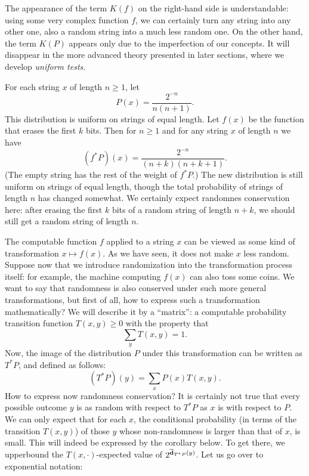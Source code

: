 The appearance of the term $K(f)$ on the right-hand side is understandable:
using some very complex function $f$, we can certainly turn any string
into any other one, also a random string into a much less random one.
On the other hand, the term $K(P)$ appears only due to the
imperfection of our concepts.
It will disappear in the more advanced theory presented in later sections,
where we develop \emph{uniform tests}.

\begin{example}
For each string $x$ of length $n \ge 1$, let
 \[
  P(x) = \frac{2^{-n}}{n(n+1)}.
 \]
This distribution is uniform on strings of equal length.
Let $f(x)$ be the function that erases the first $k$ bits.
Then for $n \ge 1$ and for any string $x$ of length $n$
we have
 \[
  (f^{*}P)(x) = \frac{2^{-n}}{(n+k)(n+k+1)}.
 \]
(The empty string has the rest of the weight of $f^{*}P$.)
The  new distribution is still uniform on strings of equal length,
though
the total probability of strings of length $n$ has changed somewhat.
We certainly expect randomnes conservation here:
after erasing the first $k$ bits of
a random string of length $n+k$, we should
still get a random string of length $n$.
\end{example}

The computable
function $f$ applied to a string $x$ can be viewed as some kind of
transformation $x \mapsto f(x)$.
As we have seen, it does not make $x$ less random.
Suppose now that we introduce randomization into the transformation
process itself: for example, the machine computing $f(x)$ can also toss
some coins.
We want to say that randomness is also conserved under such more general
transformations, but first of all, how to express such a transformation
mathematically?
We will describe it by a ``matrix'':
a computable probability transition function $T(x,y) \ge 0$ with the
property that
 \[
   \sum_{y} T(x, y) = 1.
 \]
Now, the image of the distribution $P$ under this transformation can be
written as $T^{*}P$, and defined as follows:
 \[
   (T^{*}P)(y) = \sum_{x} P(x) T(x, y).
 \]
How to express now randomness conservation?
It is certainly not true that every possible outcome $y$ is as random
with respect to $T^{*}P$ as $x$ is with respect to $P$.
We can only expect that for each $x$, the conditional probability
(in terms of the transition $T(x, y)$) of those $y$ whose non-randomness is
larger than that of $x$, is small.
This will indeed be expressed by the corollary below.
To get there, we upperbound the $T(x, \cdot)$-expected value
of $2^{\overline{\mathbf{d}}_{T^{*}P}(y)}$.
Let us go over to exponential notation:

